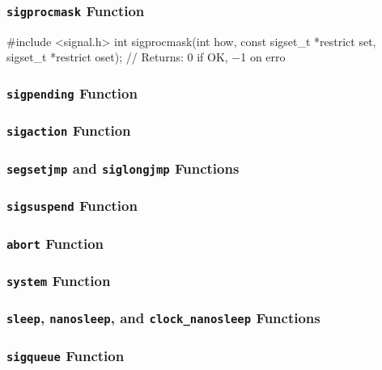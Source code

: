 \documentclass[newPxFont,sthlmFooter,nooffset]{beamer}
\begin{document}
\begin{frame}[fragile,t]
  \frametitle{\texttt{sigprocmask} Function}
\begin{codedef}
#include <signal.h>
int sigprocmask(int how, const sigset_t *restrict set, 
                sigset_t *restrict oset);
// Returns: 0 if OK, −1 on erro    
\end{codedef}
\end{frame}



\begin{frame}[fragile,t]
  \frametitle{\texttt{sigpending} Function}
  
\end{frame}



\begin{frame}[fragile,t]
  \frametitle{\texttt{sigaction} Function}
  
\end{frame}


\begin{frame}[fragile,t]
  \frametitle{\texttt{segsetjmp} and \texttt{siglongjmp} Functions}
  
\end{frame}


\begin{frame}[fragile,t]
  \frametitle{\texttt{sigsuspend} Function}
  
\end{frame}



\begin{frame}[fragile,t]
  \frametitle{\texttt{abort} Function}
  
\end{frame}


\begin{frame}[fragile,t]
  \frametitle{\texttt{system} Function}
  
\end{frame}


\begin{frame}[fragile,t]
  \frametitle{\texttt{sleep}, \texttt{nanosleep},  and \texttt{clock\_nanosleep} Functions}
  
\end{frame}


\begin{frame}[fragile,t]
  \frametitle{\texttt{sigqueue} Function}
  
\end{frame}
\end{document}
